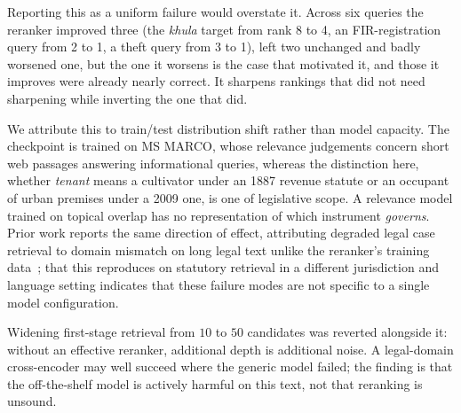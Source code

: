\documentclass[conference]{IEEEtran}
\begin{document}
Reporting this as a uniform failure would overstate it. Across six queries the
reranker improved three (the \emph{khula} target from rank 8 to 4, an
FIR-registration query from 2 to 1, a theft query from 3 to 1), left two
unchanged and badly worsened one, but the one it worsens is the case that
motivated it, and those it improves were already nearly correct. It sharpens
rankings that did not need sharpening while inverting the one that did.

We attribute this to train/test distribution shift rather than model capacity.
The checkpoint is trained on MS MARCO, whose relevance judgements concern short
web passages answering informational queries, whereas the distinction here, whether \emph{tenant} means a cultivator under an 1887 revenue statute or an
occupant of urban premises under a 2009 one, is one of legislative scope. A
relevance model trained on topical overlap has no representation of which
instrument \emph{governs}. Prior work reports the same direction of
effect, attributing degraded legal case retrieval to domain mismatch on long
legal text unlike the reranker's training data~\cite{hou2024clerc}; that this
reproduces on statutory retrieval in a different jurisdiction and language
setting indicates that these failure modes are not specific to a single model
configuration.

Widening first-stage retrieval from $10$ to $50$ candidates was reverted
alongside it: without an effective reranker, additional depth is additional
noise. A legal-domain cross-encoder may well succeed where the generic model
failed; the finding is that the off-the-shelf model is actively harmful on this
text, not that reranking is unsound.
\end{document}
